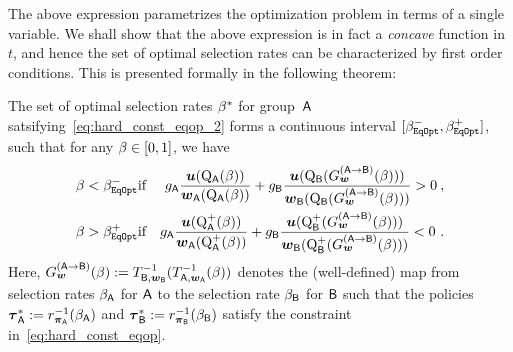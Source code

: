 	The above expression parametrizes the optimization problem in terms of a single variable. We shall show that the above expression is in fact a \emph{concave} function in $t$, and hence the set of optimal selection rates can be characterized by first order conditions. This is presented formally in the following theorem:
\begin{thm}\label{thm:eqop_selection}
	The set of optimal selection rates $\beta^*$ for group~$\mathsf{A}$ satsifying~\eqref{eq:hard_const_eqop_2} forms a continuous interval $[\beta_{\mathtt{EqOpt}}^-,\beta_{\mathtt{EqOpt}}^+]$, such that for any $\beta \in [0,1]$, we have
	\begin{eqnarray*}
		\beta < \beta_{\mathtt{EqOpt}}^- &\text{if}& g_{\mathsf{A}}\frac{\boldsymbol{u}(\mathrm{Q}_{\mathsf{A}}(\beta))}{\boldsymbol{w}_{\mathsf{A}}(\mathrm{Q}_{\mathsf{A}}(\beta))} + g_{\mathsf{B}}\frac{\boldsymbol{u}(\mathrm{Q}_{\mathsf{B}}(G^{(\mathsf{A}\to\mathsf{B})}_{\boldsymbol{w}}(\beta)))}{\boldsymbol{w}_{\mathsf{B}}(\mathrm{Q}_{\mathsf{B}}(G^{(\mathsf{A}\to\mathsf{B})}_{\boldsymbol{w}}(\beta)))} > 0 \:,\\
		\beta > \beta_{\mathtt{EqOpt}}^+ &\text{if}& g_{\mathsf{A}}\frac{\boldsymbol{u}(\mathrm{Q}^+_{\mathsf{A}}(\beta))}{\boldsymbol{w}_{\mathsf{A}}(\mathrm{Q}^+_{\mathsf{A}}(\beta))} + g_{\mathsf{B}}\frac{\boldsymbol{u}(\mathrm{Q}^+_{\mathsf{B}}(G^{(\mathsf{A}\to\mathsf{B})}_{\boldsymbol{w}}(\beta)))}{\boldsymbol{w}_{\mathsf{B}}(\mathrm{Q}^+_{\mathsf{B}}(G^{(\mathsf{A}\to\mathsf{B})}_{\boldsymbol{w}}(\beta)))} < 0 ~.
		\end{eqnarray*}
		Here, $G^{(\mathsf{A}\to\mathsf{B})}_{\boldsymbol{w}}(\beta) := T_{\mathsf{B},\boldsymbol{w}_{\mathsf{B}}}^{-1}(T_{\mathsf{A},\boldsymbol{w}_{\mathsf{A}}}^{-1}(\beta))$ denotes the (well-defined) map from selection rates $\beta_{\mathsf{A}}$ for $\mathsf{A}$ to the selection rate $\beta_{\mathsf{B}}$ for $\mathsf{B}$ such that the policies $\boldsymbol{\tau}_{\mathsf{A}}^* := r_{\boldsymbol{\pi}_{\mathsf{A}}}^{-1}(\beta_{\mathsf{A}})$ and $\boldsymbol{\tau}_{\mathsf{B}}^* := r_{\boldsymbol{\pi}_{\mathsf{B}}}^{-1}(\beta_{\mathsf{B}})$ satisfy the constraint in~\eqref{eq:hard_const_eqop}. 
		\end{thm}
